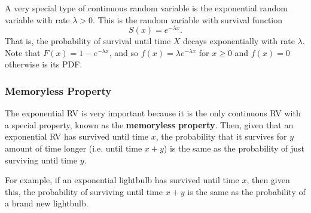 \bigskip 

A very special type of continuous random variable is the exponential random variable with rate $\lambda > 0$. This is the random variable with survival function 
\[S(x) = e^{-\lambda x}.\]
That is, the probability of survival until time $X$ decays exponentially with rate $\lambda$. Note that $F(x) = 1 - e^{-\lambda x}$, and so $f(x) = \lambda e^{-\lambda x}$ for $x \geq 0$ and $f(x) = 0$ otherwise is its PDF. 

\subsubsection{Memoryless Property}
The exponential RV is very important because it is the only continuous RV with a special property, known as the \textbf{memoryless property}. Then, given that an exponential RV has survived until time $x$, the probability that it survives for $y$ amount of time longer (i.e. until time $x + y$) is the same as the probability of just surviving until time $y$. 

\bigskip 

For example, if an exponential lightbulb has survived until time $x$, then given this, the probability of surviving until time $x + y$ is the same as the probability of a brand new lightbulb. 